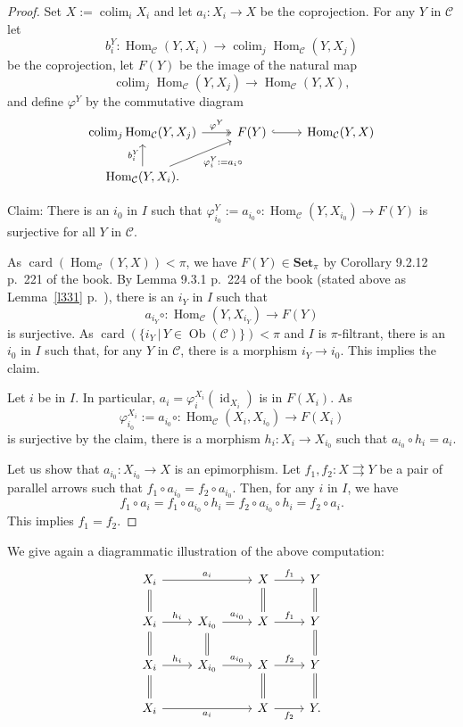 \documentclass[12pt]{article}
\theoremstyle{remark}
\theoremstyle{definition}
\newcommand{\C}{\mathcal C}
\newcommand{\Set}{\mathbf{Set}}
\newcommand{\pp}{\varphi}
\newcommand{\parar}{\rightrightarrows}
\DeclareMathOperator*{\colim}{colim}
\DeclareMathOperator{\card}{card}
\DeclareMathOperator{\id}{id}
\DeclareMathOperator{\Hom}{Hom}
\DeclareMathOperator{\Ob}{Ob}
\begin{document}
\begin{proof}
Set $X:=\colim_iX_i$ and let $a_i:X_i\to X$ be the coprojection. For any $Y$ in $\C$ let 
$$
b^Y_i:\Hom_\C(Y,X_i)\to\colim_j\Hom_\C(Y,X_j)
$$ 
be the coprojection, let $F(Y)$ be the image of the natural map 
$$
\colim_j\Hom_\C(Y,X_j)\to\Hom_\C(Y,X),
$$ 
and define $\pp^Y$ by the commutative diagram 
$$
\begin{tikzcd}
\colim_j\Hom_\C(Y,X_j)\ar[two heads]{r}{\pp^Y}&F(Y)\ar[hook]{r}&\Hom_\C(Y,X)\\ 
\Hom_\C(Y,X_i).\ar{u}{b^Y_i}\ar{ur}[swap]{\pp^Y_i:=a_i\circ}
\end{tikzcd}
$$ 

Claim: There is an $i_0$ in $I$ such that $\pp^Y_{i_0}:=a_{i_0}\circ:\Hom_\C(Y,X_{i_0})\to F(Y)$ is surjective for all $Y$ in $\C$.

As $\card(\Hom_\C(Y,X))<\pi$, we have $F(Y)\in\Set_\pi$ by Corollary 9.2.12 p.~221 of the book. By Lemma 9.3.1 p.~224 of the book (stated above as Lemma~\ref{l331} p.~\pageref{l331}), there is an $i_Y$ in $I$ such that 
$$
a_{i_Y}\circ:\Hom_\C(Y,X_{i_Y})\to F(Y)
$$ 
is surjective. As $\card(\{i_Y\,|\,Y\in\Ob(\C)\})<\pi$ and $I$ is $\pi$-filtrant, there is an $i_0$ in $I$ such that, for any $Y$ in $\C$, there is a morphism $i_Y\to i_0$. This implies the claim. 

Let $i$ be in $I$. In particular, $a_i=\pp^{X_i}_i(\id_{X_i})$ is in $F(X_i)$. As 
$$
\pp^{X_i}_{i_0}:=a_{i_0}\circ:\Hom_\C(X_i,X_{i_0})\to F(X_i)
$$ 
is surjective by the claim, there is a morphism $h_i:X_i\to X_{i_0}$ such that $a_{i_0}\circ h_i=a_i$. 

Let us show that $a_{i_0}:X_{i_0}\to X$ is an epimorphism. Let $f_1,f_2:X\parar Y$ be a pair of parallel arrows such that $f_1\circ a_{i_0}=f_2\circ a_{i_0}$. Then, for any $i$ in $I$, we have 
$$
f_1\circ a_i=f_1\circ a_{i_0}\circ h_i=f_2\circ a_{i_0}\circ h_i=f_2\circ a_i.
$$ 
This implies $f_1=f_2$.
\end{proof}

We give again a diagrammatic illustration of the above computation:
$$
\begin{tikzcd}
X_i\ar[equal]{d}\ar{rr}{a_i}&&X\ar[equal]{d}\ar{r}{f_1}&Y\ar[equal]{d}\\ 
X_i\ar[equal]{d}\ar{r}{h_i}&X_{i_0}\ar[equal]{d}\ar{r}{a_{i_0}}&X\ar{r}{f_1}&Y\ar[equal]{d}\\ 
X_i\ar[equal]{d}\ar{r}{h_i}&X_{i_0}\ar{r}{a_{i_0}}&X\ar[equal]{d}\ar{r}{f_2}&Y\ar[equal]{d}\\ 
X_i\ar{rr}[swap]{a_i}&&X\ar{r}[swap]{f_2}&Y.
\end{tikzcd}
$$ 
\end{document}
